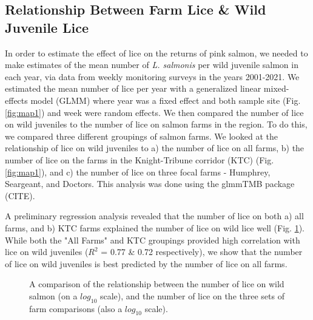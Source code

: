 \documentclass{article}
\begin{document}
\subsection{Relationship Between Farm Lice \& Wild Juvenile Lice}

In order to estimate the effect of lice on the returns of pink salmon, we needed to make estimates of the mean number of \textit{L. salmonis} per wild juvenile salmon in each year, via data from weekly monitoring surveys in the years 2001-2021. We estimated the mean number of lice per year with a generalized linear mixed-effects model (GLMM) where year was a fixed effect and both sample site (Fig. \ref{fig:map1}) and week were random effects. We then compared the number of lice on wild juveniles to the number of lice on salmon farms in the region. To do this, we compared three different groupings of salmon farms. We looked at the relationship of lice on wild juveniles to a) the number of lice on all farms, b) the number of lice on the farms in the Knight-Tribune corridor (KTC) (Fig. \ref{fig:map1}), and c) the number of lice on three focal farms - Humphrey, Seargeant, and Doctors. This analysis was done using the glmmTMB package (CITE). 

A preliminary regression analysis revealed that the number of lice on both a) all farms, and b) KTC farms explained the number of lice on wild lice well (Fig. \ref{fig:farm-comp}). While both the "All Farms" and KTC groupings provided high correlation with lice on wild juveniles ($R^2$ = 0.77 \& 0.72 respectively), we show that the number of lice on wild juveniles is best predicted by the number of lice on all farms. 

\begin{figure}[h]
    \centering
    \caption{A comparison of the relationship between the number of lice on
wild salmon (on a $log_{10}$ scale), and the number of lice on the three sets of farm
comparisons (also a $log_{10}$ scale).}
    \label{fig:farm-comp}
\end{figure} 
\end{document}
